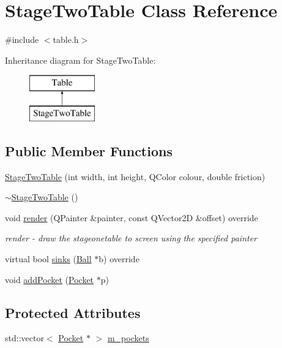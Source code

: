 \hypertarget{class_stage_two_table}{}\section{Stage\+Two\+Table Class Reference}
\label{class_stage_two_table}


{\ttfamily \#include $<$table.\+h$>$}

Inheritance diagram for Stage\+Two\+Table\+:\begin{figure}[H]
\begin{center}
\leavevmode
\includegraphics[height=2.000000cm]{class_stage_two_table}
\end{center}
\end{figure}
\subsection*{Public Member Functions}
\begin{DoxyCompactItemize}
\item 
\mbox{\hyperlink{class_stage_two_table_abfe56f335f3eda0c72ae8477fe65e71f}{Stage\+Two\+Table}} (int width, int height, Q\+Color colour, double friction)
\item 
\mbox{\hyperlink{class_stage_two_table_a91ebe178acea5030255266e54adfa7a9}{$\sim$\+Stage\+Two\+Table}} ()
\item 
void \mbox{\hyperlink{class_stage_two_table_ad19f7aa333b65d84b67ce2e55330a669}{render}} (Q\+Painter \&painter, const Q\+Vector2D \&offset) override
\begin{DoxyCompactList}\small\item\em render -\/ draw the stageonetable to screen using the specified painter \end{DoxyCompactList}\item 
virtual bool \mbox{\hyperlink{class_stage_two_table_a3e015671be449da741adaf86e00ec844}{sinks}} (\mbox{\hyperlink{class_ball}{Ball}} $\ast$b) override
\item 
void \mbox{\hyperlink{class_stage_two_table_a13e9626ecbb5f84766efe7342e122873}{add\+Pocket}} (\mbox{\hyperlink{class_pocket}{Pocket}} $\ast$p)
\end{DoxyCompactItemize}
\subsection*{Protected Attributes}
\begin{DoxyCompactItemize}
\item 
std\+::vector$<$ \mbox{\hyperlink{class_pocket}{Pocket}} $\ast$ $>$ \mbox{\hyperlink{class_stage_two_table_aba6026e62b3894b57264b080e6a72b75}{m\+\_\+pockets}}
\end{DoxyCompactItemize}


